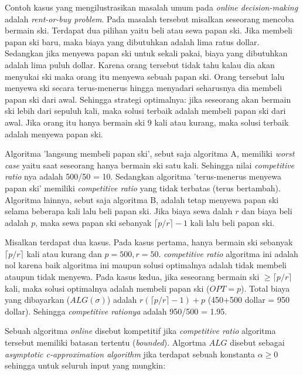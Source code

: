 \par Contoh kasus yang mengilustrasikan masalah umum pada \textit{online decision-making} adalah \textit{rent-or-buy problem}. Pada masalah tersebut misalkan seseorang mencoba bermain ski. Terdapat dua pilihan yaitu beli atau sewa papan ski. Jika membeli papan ski baru, maka biaya yang dibutuhkan adalah  lima ratus dollar. Sedangkan jika menyewa papan ski untuk sekali pakai, biaya yang dibutuhkan adalah lima puluh dollar. Karena orang tersebut tidak tahu kalau dia akan menyukai ski maka orang itu menyewa sebuah papan ski. Orang tersebut lalu menyewa ski secara terus-menerus hingga menyadari seharusnya dia membeli papan ski dari awal. Sehingga strategi optimalnya: jika seseorang akan bermain ski lebih dari sepuluh kali, maka solusi terbaik adalah membeli papan ski dari awal. Jika orang itu hanya bermain ski 9 kali atau kurang, maka solusi terbaik adalah menyewa papan ski. 

\par Algoritma 'langsung membeli papan ski', sebut saja algoritma A, memiliki \textit{worst case} yaitu saat seseorang hanya bermain ski satu kali. Sehingga nilai \textit{competitive ratio} nya adalah 500/50 = 10. Sedangkan algoritma 'terus-menerus menyewa papan ski' memiliki \textit{competitive ratio} yang tidak terbatas (terus bertambah). Algoritma lainnya, sebut saja algoritma B, adalah tetap menyewa papan ski selama beberapa kali lalu beli papan ski. Jika biaya sewa dalah $r$ dan biaya beli adalah $p$, maka sewa papan ski sebanyak $\lceil{p/r}\rceil-1$ kali lalu beli papan ski. 

\par Misalkan terdapat dua kasus. Pada kasus pertama, hanya bermain ski sebanyak $\lceil{p/r}\rceil$ kali atau kurang dan $p=500, r=50$. \textit{competitive ratio} algoritma ini adalah nol karena baik algoritma ini maupun solusi optimalnya adalah tidak membeli ataupun tidak menyewa. Pada kasus kedua, jika seseorang bermain ski $\geq\lceil{p/r}\rceil$ kali, maka solusi optimalnya adalah membeli papan ski ($OPT = p$). Total biaya yang dibayarkan ($ALG(\sigma)$) adalah $r(\lceil{p/r}\rceil-1)+p$ (450+500 dollar = 950 dollar). Sehingga  \textit{competitive rationya} adalah 950/500 = 1.95.

\par Sebuah algoritma \textit{online} disebut kompetitif jika \textit{competitive ratio} algoritma tersebut memiliki batasan tertentu (\textit{bounded})\cite{algo_online_3:13}. Algortma $ALG$ disebut sebagai \textit{asymptotic c-approximation algorithm} jika terdapat sebuah konstanta $\alpha\geq 0$ sehingga untuk seluruh input yang mungkin:

